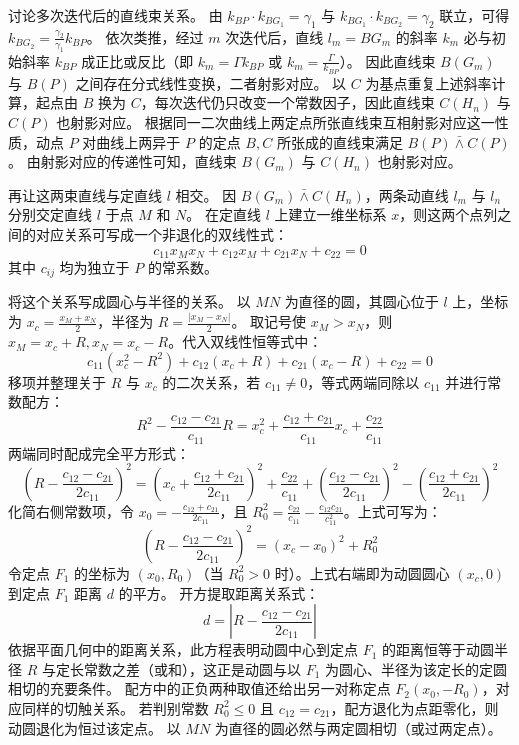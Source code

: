 \begin{solution}
讨论多次迭代后的直线束关系。
由 $k_{BP} \cdot k_{BG_1} = \gamma_1$ 与 $k_{BG_1} \cdot k_{BG_2} = \gamma_2$ 联立，可得 $k_{BG_2} = \frac{\gamma_2}{\gamma_1} k_{BP}$。
依次类推，经过 $m$ 次迭代后，直线 $l_m = BG_m$ 的斜率 $k_m$ 必与初始斜率 $k_{BP}$ 成正比或反比（即 $k_m = \Gamma k_{BP}$ 或 $k_m = \frac{\Gamma}{k_{BP}}$）。
因此直线束 $B(G_m)$ 与 $B(P)$ 之间存在分式线性变换，二者射影对应。
以 $C$ 为基点重复上述斜率计算，起点由 $B$ 换为 $C$，每次迭代仍只改变一个常数因子，因此直线束 $C(H_n)$ 与 $C(P)$ 也射影对应。
根据同一二次曲线上两定点所张直线束互相射影对应这一性质，动点 $P$ 对曲线上两异于 $P$ 的定点 $B, C$ 所张成的直线束满足 $B(P) \bar{\wedge} C(P)$。
由射影对应的传递性可知，直线束 $B(G_m)$ 与 $C(H_n)$ 也射影对应。

再让这两束直线与定直线 $l$ 相交。
因 $B(G_m) \bar{\wedge} C(H_n)$，两条动直线 $l_m$ 与 $l_n$ 分别交定直线 $l$ 于点 $M$ 和 $N$。
在定直线 $l$ 上建立一维坐标系 $x$，则这两个点列之间的对应关系可写成一个非退化的双线性式：
$$ c_{11} x_M x_N + c_{12} x_M + c_{21} x_N + c_{22} = 0 $$
其中 $c_{ij}$ 均为独立于 $P$ 的常系数。

将这个关系写成圆心与半径的关系。
以 $MN$ 为直径的圆，其圆心位于 $l$ 上，坐标为 $x_c = \frac{x_M + x_N}{2}$，半径为 $R = \frac{|x_M - x_N|}{2}$。
取记号使 $x_M > x_N$，则 $x_M = x_c + R, x_N = x_c - R$。代入双线性恒等式中：
$$ c_{11}(x_c^2 - R^2) + c_{12}(x_c + R) + c_{21}(x_c - R) + c_{22} = 0 $$
移项并整理关于 $R$ 与 $x_c$ 的二次关系，若 $c_{11} \neq 0$，等式两端同除以 $c_{11}$ 并进行常数配方：
$$ R^2 - \frac{c_{12}-c_{21}}{c_{11}} R = x_c^2 + \frac{c_{12}+c_{21}}{c_{11}} x_c + \frac{c_{22}}{c_{11}} $$
两端同时配成完全平方形式：
$$ \left( R - \frac{c_{12}-c_{21}}{2c_{11}} \right)^2 = \left( x_c + \frac{c_{12}+c_{21}}{2c_{11}} \right)^2 + \frac{c_{22}}{c_{11}} + \left( \frac{c_{12}-c_{21}}{2c_{11}} \right)^2 - \left( \frac{c_{12}+c_{21}}{2c_{11}} \right)^2 $$
化简右侧常数项，令 $x_0 = -\frac{c_{12}+c_{21}}{2c_{11}}$，且 $R_0^2 = \frac{c_{22}}{c_{11}} - \frac{c_{12} c_{21}}{c_{11}^2}$。上式可写为：
$$ \left( R - \frac{c_{12}-c_{21}}{2c_{11}} \right)^2 = (x_c - x_0)^2 + R_0^2 $$
令定点 $F_1$ 的坐标为 $(x_0, R_0)$（当 $R_0^2 > 0$ 时）。上式右端即为动圆圆心 $(x_c, 0)$ 到定点 $F_1$ 距离 $d$ 的平方。
开方提取距离关系式：
$$ d = \left| R - \frac{c_{12}-c_{21}}{2c_{11}} \right| $$
依据平面几何中的距离关系，此方程表明动圆中心到定点 $F_1$ 的距离恒等于动圆半径 $R$ 与定长常数之差（或和），这正是动圆与以 $F_1$ 为圆心、半径为该定长的定圆相切的充要条件。
配方中的正负两种取值还给出另一对称定点 $F_2(x_0, -R_0)$，对应同样的切触关系。
若判别常数 $R_0^2 \le 0$ 且 $c_{12}=c_{21}$，配方退化为点距零化，则动圆退化为恒过该定点。
以 $MN$ 为直径的圆必然与两定圆相切（或过两定点）。
\end{solution}

